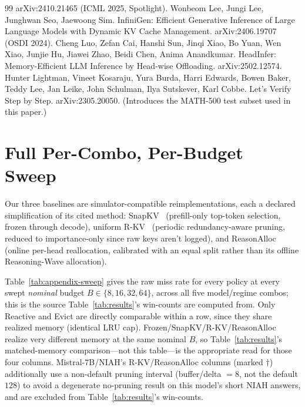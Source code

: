 \documentclass{article}
\begin{document}
\begin{thebibliography}{99}
    arXiv:2410.21465 (ICML 2025, Spotlight).
    Wonbeom Lee, Jungi Lee, Junghwan Seo, Jaewoong Sim. InfiniGen:
    Efficient Generative Inference of Large Language Models with Dynamic
    KV Cache Management. arXiv:2406.19707 (OSDI 2024).
    Cheng Luo, Zefan Cai, Hanshi Sun, Jinqi Xiao, Bo Yuan, Wen Xiao,
    Junjie Hu, Jiawei Zhao, Beidi Chen, Anima Anandkumar. HeadInfer:
    Memory-Efficient LLM Inference by Head-wise Offloading.
    arXiv:2502.12574.
    Hunter Lightman, Vineet Kosaraju, Yura Burda, Harri Edwards, Bowen
    Baker, Teddy Lee, Jan Leike, John Schulman, Ilya Sutskever, Karl
    Cobbe. Let's Verify Step by Step. arXiv:2305.20050. (Introduces the
    MATH-500 test subset used in this paper.)

\end{thebibliography}

\clearpage
\appendix
\par{}\par\vspace{6pt}
\section{Full Per-Combo, Per-Budget Sweep}
\label{sec:appendix}

Our three baselines are simulator-compatible reimplementations, each a
declared simplification of its cited method: SnapKV~\cite{snapkv}
(prefill-only top-token selection, frozen through decode), uniform
R-KV~\cite{rkv} (periodic redundancy-aware pruning, reduced to
importance-only since raw keys aren't logged), and
ReasonAlloc~\cite{reasonalloc} (online per-head reallocation,
calibrated with an equal split rather than its offline Reasoning-Wave
allocation).

Table~\ref{tab:appendix-sweep} gives the raw miss rate for every policy
at every swept \emph{nominal} budget $B \in \{8,16,32,64\}$, across all
five model/regime combos; this is the source Table~\ref{tab:results}'s
win-counts are computed from. Only Reactive and Evict are directly
comparable within a row, since they share realized memory (identical
LRU cap). Frozen/SnapKV/R-KV/ReasonAlloc realize very different memory
at the same nominal $B$, so Table~\ref{tab:results}'s matched-memory
comparison---not this table---is the appropriate read for those four
columns. Mistral-7B/NIAH's R-KV/ReasonAlloc columns (marked $\dagger$)
additionally use a non-default pruning interval (buffer/delta $=8$,
not the default $128$) to avoid a degenerate no-pruning result on this
model's short NIAH answers, and are excluded from
Table~\ref{tab:results}'s win-counts.
\end{document}
